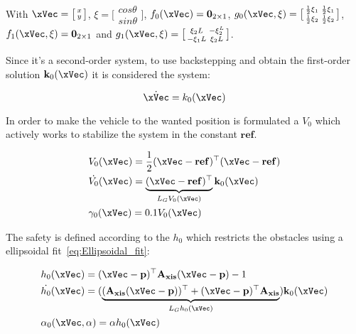 With \(\xVec =  \bigl[\begin{smallmatrix} x \\ y \end{smallmatrix}\bigr]\), \(\xi =  \bigl[\begin{smallmatrix} cos\theta \\ sin\theta \end{smallmatrix}\bigr]\), \(f_0(\xVec) = \mathbf{0}_{2 \times 1}\), \(g_0(\xVec, \xi) = \bigl[\begin{smallmatrix} \frac{1}{2}\xi_1 & \frac{1}{2}\xi_1 \\ \frac{1}{2}\xi_2 & \frac{1}{2}\xi_2 \end{smallmatrix}\bigr] \), \(f_1(\xVec, \xi) = \mathbf{0}_{2 \times 1}\) and \(g_1(\xVec, \xi) =  \bigl[\begin{smallmatrix} \xi_2L & -\xi_2^L \\ -\xi_1L &  \xi_2L \end{smallmatrix}\bigr]\). \par

Since it's a second-order system, to use backstepping and obtain the first-order solution \(\mathbf{k}_0(\xVec)\) it is considered the system:

\begin{equation}
    \dot{\xVec} = k_0(\xVec) 
    \label{eq:first_order_unicycle_model_backstepp}
\end{equation}

In order to make the vehicle to the wanted position is formulated a  \(V_0\) which actively works to stabilize the system in the constant \(\mathbf{ref}\).

\begin{subequations}
   \begin{align}
    &V_0(\xVec) = \frac{1}{2}(\xVec-\mathbf{ref})^{\top}(\xVec-\mathbf{ref}) \label{eq:V0_unicycle} \\
    &\dot{V_0}(\xVec) = \underbrace{(\xVec-\mathbf{ref})^{\top}}_{L_GV_0(\xVec)}\mathbf{k}_0(\xVec)  \label{eq:dot_V0_unicycle} \\
    &\gamma_0(\xVec)  = 0.1V_0(\xVec) \label{eq:CLF_gamma0_unicycle}
\end{align}
\label{eq:CLF0_unicycle}
\end{subequations}


The safety is defined according to the  \(h_0\) which restricts the obstacles using a ellipsoidal fit~\ref{eq:Ellipsoidal_fit}:

\begin{subequations}
   \begin{align}
    &h_0(\xVec) = (\xVec-\mathbf{p})^{\top}\mathbf{A_{xis}}(\xVec-\mathbf{p}) - 1 \label{eq:h0_unicycle} \\
    &\dot{h_0}(\xVec) = (\underbrace{(\mathbf{A_{xis}}(\xVec-\mathbf{p}))^{\top} + (\xVec-\mathbf{p})^{\top}\mathbf{A_{xis}}}_{L_Gh_0(\xVec)})\mathbf{k}_0(\xVec)  \label{eq:dot_h0_unicycle} \\
    &\alpha_0(\xVec, \alpha)  = \alpha h_0(\xVec) \label{eq:CBF_alpha0_unicycle}
\end{align}
\label{eq:CBF0_unicycle}
\end{subequations}


